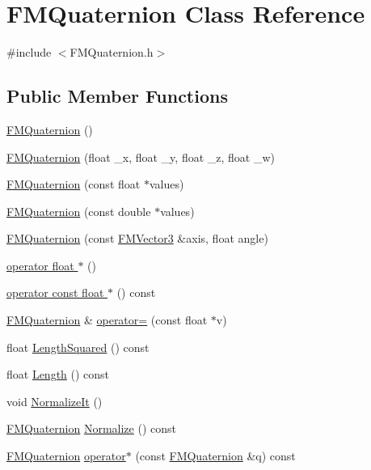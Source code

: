\hypertarget{classFMQuaternion}{
\section{FMQuaternion Class Reference}
\label{classFMQuaternion}
}


{\ttfamily \#include $<$FMQuaternion.h$>$}

\subsection*{Public Member Functions}
\begin{DoxyCompactItemize}
\item 
\hyperlink{classFMQuaternion_a005eee578d5c2a7ed5f687e24adb4816}{FMQuaternion} ()
\item 
\hyperlink{classFMQuaternion_aa919c71bc03cd277d9996b50e4ddefda}{FMQuaternion} (float \_\-x, float \_\-y, float \_\-z, float \_\-w)
\item 
\hyperlink{classFMQuaternion_a17a6a5a5aca81debb509b8f96626d14d}{FMQuaternion} (const float $\ast$values)
\item 
\hyperlink{classFMQuaternion_a14018b57e6f3843aff52bc6fc60e3ea2}{FMQuaternion} (const double $\ast$values)
\item 
\hyperlink{classFMQuaternion_a9c5665bf329c191c9c662cf92ae18b6f}{FMQuaternion} (const \hyperlink{classFMVector3}{FMVector3} \&axis, float angle)
\item 
\hyperlink{classFMQuaternion_a0e7d1d7d85a8c7f1c70de0d01a44790e}{operator float $\ast$} ()
\item 
\hyperlink{classFMQuaternion_a1bf6463628b0027b3a4da62f0e93ec17}{operator const float $\ast$} () const 
\item 
\hyperlink{classFMQuaternion}{FMQuaternion} \& \hyperlink{classFMQuaternion_afac9386b2d79c2d63aee70c4d89184ae}{operator=} (const float $\ast$v)
\item 
float \hyperlink{classFMQuaternion_aa51d404a7f40faa3da1bfa6745eb6851}{LengthSquared} () const 
\item 
float \hyperlink{classFMQuaternion_ab21c955c4e7feaadc04e420358e59ecf}{Length} () const 
\item 
void \hyperlink{classFMQuaternion_a25977629bc7edf72a611e7e1cd89ae96}{NormalizeIt} ()
\item 
\hyperlink{classFMQuaternion}{FMQuaternion} \hyperlink{classFMQuaternion_a053fddada5c7a90057b0d49264715c71}{Normalize} () const 
\item 
\hyperlink{classFMQuaternion}{FMQuaternion} \hyperlink{classFMQuaternion_a213dae34f7dd861cbe2372cf4751684c}{operator$\ast$} (const \hyperlink{classFMQuaternion}{FMQuaternion} \&q) const 

\end{DoxyCompactItemize}
